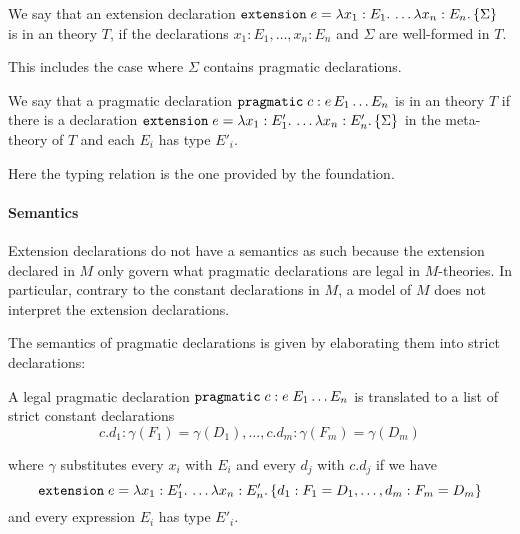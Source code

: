 \begin{definition}\label{def:ext-legal}
We say that an extension declaration 
$\mathtt{extension}\;e = \lambda x_1:E_1.\,\ldots\lambda x_n:E_n.\,\{\Sigma\}$
\noindent is  in an {\mmt} theory $T$, if the declarations
$x_1:E_1,\ldots,x_n:E_n$ and $\Sigma$ are well-formed in $T$.

This includes the case where $\Sigma$ contains pragmatic declarations.
\end{definition}

\begin{definition}\label{def:prag-legal}
We say that a pragmatic declaration 
$\mathtt{pragmatic}\;c:e\,E_1\ldots E_n$
\noindent is  in an {\mmt} theory $T$ if there is a declaration
$\mathtt{extension}\;e = \lambda x_1:E'_1.\,\ldots\lambda x_n:E'_n.\,\{\Sigma\}$
in the meta-theory of $T$ and each $E_i$ has type $E'_i$.
\end{definition}

Here the typing relation is the one provided by the {\mmt} foundation.

\paragraph{Semantics}
Extension declarations do not have a semantics as such because the extension declared in $M$ only govern what pragmatic declarations are legal in $M$-theories. In particular, contrary to the constant declarations in $M$, a model of $M$ does not interpret the extension declarations.

The semantics of pragmatic declarations is given by elaborating them into strict declarations:
\begin{definition}\label{def:ptos}
A legal pragmatic declaration $\mathtt{pragmatic}\;c:e\;E_1\ldots E_n$ is translated to a list of strict constant declarations 
\[c.d_1 : \gamma(F_1) = \gamma(D_1),\ldots,c.d_m :\gamma(F_m) = \gamma(D_m)\]

\noindent where $\gamma$ substitutes every $x_i$ with $E_i$ and every $d_j$ with $c.d_j$
if we have 
\[\mathtt{extension}\;e = \lambda x_1:E'_{1}.\,\ldots\lambda x_n:E'_{n}.\,\{d_1 : F_1 = D_1,\ldots,d_m : F_m = D_m\}\]
\noindent and every expression $E_i$ has type $E'_i$.
\end{definition}

